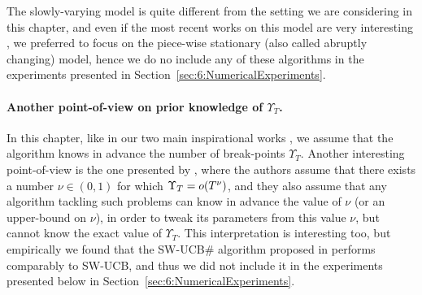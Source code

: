 The slowly-varying model is quite different from the setting we are considering in this chapter, and even if the most recent works on this model are very interesting \cite{WeiSrivastava18Abruptly}, we preferred to focus on the piece-wise stationary (also called abruptly changing) model,
hence we do no include any of these algorithms in the experiments presented in Section~\ref{sec:6:NumericalExperiments}.


\paragraph{Another point-of-view on prior knowledge of $\Upsilon_T$.}
%
In this chapter, like in our two main inspirational works \cite{CaoZhenKvetonXie18,LiuLeeShroff17},
we assume that the algorithm knows in advance the number of break-points $\Upsilon_T$.
Another interesting point-of-view is the one presented by \cite{WeiSrivastava18Abruptly,WeiSrivastava18Distributed},
where the authors assume that there exists a number $\nu\in(0,1)$ for which $\Upsilon_T = \mathop{}\mathopen{}o\mathopen{}\left(T^{\nu}\right)$,
and they also assume that any algorithm tackling such problems can know in advance the value of $\nu$ (or an upper-bound on $\nu$), in order to tweak its parameters from this value $\nu$, but cannot know the exact value of $\Upsilon_T$.
%
This interpretation is interesting too,
but empirically we found that the SW-UCB\# algorithm proposed in \cite{WeiSrivastava18Abruptly} performs comparably to SW-UCB, and thus we did not include it in the experiments presented below in Section~\ref{sec:6:NumericalExperiments}.
%


